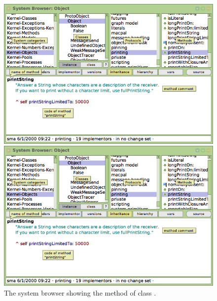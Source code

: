 \documentclass[a4paper,10pt,twoside]{book}
\begin{document}
\begin{figure}[htb]
\ifluluelse
	{\centerline {\includegraphics[width=\textwidth]{ClassBrowser2}}}
	{\centerline {\includegraphics[scale=0.7]{ClassBrowser2}}}
\caption{The system browser showing the  method of class .
\label{fig:classBrowser}}
\end{figure}
\end{document}
